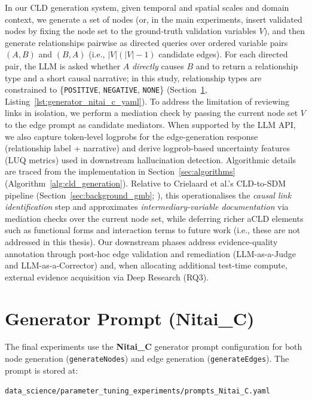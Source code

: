 In our CLD generation system, given temporal and spatial scales and domain context, we generate a set of nodes (or, in the main experiments, insert validated nodes by fixing the node set to the ground-truth validation variables \(V\)), and then generate relationships pairwise as directed queries over ordered variable pairs \((A,B)\) and \((B,A)\) (i.e., \( |V|(|V|-1)\) candidate edges). For each directed pair, the LLM is asked whether \(A\) \emph{directly} causes \(B\) and to return a relationship type and a short causal narrative; in this study, relationship types are constrained to \{\texttt{POSITIVE}, \texttt{NEGATIVE}, \texttt{NONE}\} (Section~\ref{sec:generator_prompt_nitai_c}, Listing~\ref{lst:generator_nitai_c_yaml}). To address the limitation of reviewing links in isolation, we perform a mediation check by passing the current node set \(V\) to the edge prompt as candidate mediators. When supported by the LLM API, we also capture token-level logprobs for the edge-generation response (relationship label + narrative) and derive logprob-based uncertainty features (LUQ metrics) used in downstream hallucination detection. Algorithmic details are traced from the implementation in Section~\ref{sec:algorithms} (Algorithm~\ref{alg:cld_generation}). Relative to Crielaard et al.'s CLD-to-SDM pipeline (Section~\ref{sec:background_gmb}; \citet{crielaard2024refining}), this operationalises the \emph{causal link identification} step and approximates \emph{intermediary-variable documentation} via mediation checks over the current node set, while deferring richer aCLD elements such as functional forms and interaction terms to future work (i.e., these are not addressed in this thesis). Our downstream phases address evidence-quality annotation through post-hoc edge validation and remediation (LLM-as-a-Judge and LLM-as-a-Corrector) and, when allocating additional test-time compute, external evidence acquisition via Deep Research (RQ3).

\section{Generator Prompt (Nitai\_C)}
\label{sec:generator_prompt_nitai_c}

The final experiments use the \textbf{Nitai\_C} generator prompt configuration for both node generation (\texttt{generateNodes}) and edge generation (\texttt{generateEdges}). The prompt is stored at:

\noindent\texttt{data\_science/parameter\_tuning\_experiments/prompts\_Nitai\_C.yaml}

